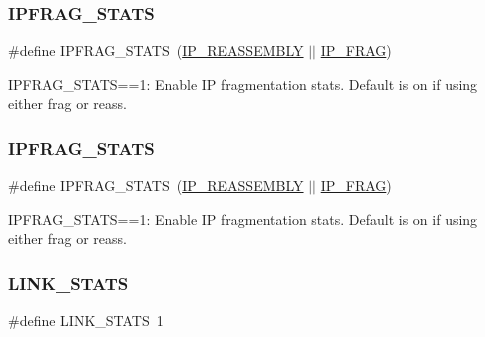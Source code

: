 \subsubsection{\texorpdfstring{I\+P\+F\+R\+A\+G\+\_\+\+S\+T\+A\+TS}{IPFRAG\_STATS}\hspace{0.1cm}{\footnotesize\ttfamily [1/2]}}
{\footnotesize\ttfamily \#define I\+P\+F\+R\+A\+G\+\_\+\+S\+T\+A\+TS~(\hyperlink{group__lwip__opts__ipv4_ga1a31ab0e0f37b17d40fa7c35bc2c4f69}{I\+P\+\_\+\+R\+E\+A\+S\+S\+E\+M\+B\+LY} $\vert$$\vert$ \hyperlink{group__lwip__opts__ipv4_gaf85c8bdd5035b6cada790b4cc2a209a4}{I\+P\+\_\+\+F\+R\+AG})}

I\+P\+F\+R\+A\+G\+\_\+\+S\+T\+A\+TS==1\+: Enable IP fragmentation stats. Default is on if using either frag or reass. \mbox{\label{group__lwip__opts__stats_gac9a4fbb46df3c0f479a334d0e34fb74f}} 
\subsubsection{\texorpdfstring{I\+P\+F\+R\+A\+G\+\_\+\+S\+T\+A\+TS}{IPFRAG\_STATS}\hspace{0.1cm}{\footnotesize\ttfamily [2/2]}}
{\footnotesize\ttfamily \#define I\+P\+F\+R\+A\+G\+\_\+\+S\+T\+A\+TS~(\hyperlink{group__lwip__opts__ipv4_ga1a31ab0e0f37b17d40fa7c35bc2c4f69}{I\+P\+\_\+\+R\+E\+A\+S\+S\+E\+M\+B\+LY} $\vert$$\vert$ \hyperlink{group__lwip__opts__ipv4_gaf85c8bdd5035b6cada790b4cc2a209a4}{I\+P\+\_\+\+F\+R\+AG})}

I\+P\+F\+R\+A\+G\+\_\+\+S\+T\+A\+TS==1\+: Enable IP fragmentation stats. Default is on if using either frag or reass. \mbox{\label{group__lwip__opts__stats_gae58b452782d0327ae728192686c5a84a}} 
\subsubsection{\texorpdfstring{L\+I\+N\+K\+\_\+\+S\+T\+A\+TS}{LINK\_STATS}\hspace{0.1cm}{\footnotesize\ttfamily [1/2]}}
{\footnotesize\ttfamily \#define L\+I\+N\+K\+\_\+\+S\+T\+A\+TS~1}

